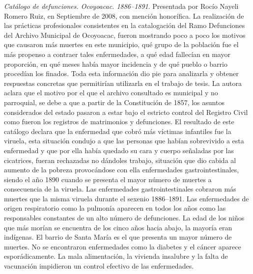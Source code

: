 \smallskip 
\noindent \textsl{Catálogo de defunciones. Ocoyoacac. 
1886--1891}. Presentada por Rocío Nayeli Romero Ruiz, en Septiembre 
de 2008, con mención honorífica. La realización de las prácticas 
profesionales consistentes en la catalogación del Ramo Defunciones del 
Archivo Municipal de Ocoyoacac, fueron mostrando poco a poco los 
motivos que causaron más muertes en este municipio, qué grupo de la 
población fue el más propenso a contraer tales enfermedades, a qué 
edad fallecían en mayor proporción, en qué meses había mayor incidencia 
y de qué pueblo o barrio procedían los finados. Toda esta información 
dio pie para analizarla y obtener respuestas concretas que permitirían 
utilizarla en el trabajo de tesis. La autora aclara que el  motivo por 
el que el archivo consultado es municipal y no parroquial, se debe a 
que a partir de la Constitución de 1857, los asuntos considerados del 
estado pasaron a estar bajo el estricto control del Registro Civil como 
fueron los registros de matrimonios y defunciones. El resultado de este 
catálogo declara que la enfermedad que cobró más víctimas infantiles 
fue la viruela, esta situación condujo a que las personas que habían 
sobrevivido a esta enfermedad y que por ella había quedado su cara y 
cuerpo  señaladas por las cicatrices, fueran rechazadas no dándoles 
trabajo, situación que dio cabida al aumento de la pobreza provocándose 
con ella enfermedades gastrointestinales, siendo el año 1890 cuando se 
presenta el mayor número de muertes a consecuencia de la viruela. Las 
enfermedades gastrointestinales cobraron más muertes que la misma 
viruela durante el sexenio 1886--1891. Las enfermedades de origen 
respiratorio como la pulmonía aparecen en todos los años como las
responsables constantes de un alto número de defunciones. La edad de los 
niños que más morían se encuentra de los cinco años hacia abajo, la 
mayoría eran indígenas. El barrio de Santa María es el que presenta un 
mayor número de muertes. No se encontraron enfermedades como la 
diabetes y el cáncer aparece esporádicamente. La mala alimentación, la 
vivienda insalubre y la falta de vacunación impidieron un control 
efectivo de las enfermedades. 
\enlargethispage{\baselineskip}

